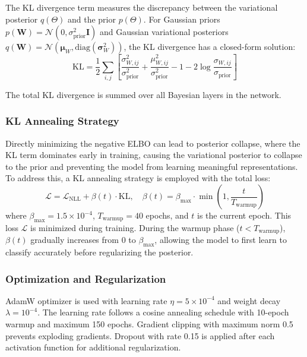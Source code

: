 \documentclass[lettersize,journal]{IEEEtran}
\begin{document}
The KL divergence term measures the discrepancy between the variational posterior $q(\Theta)$ and the prior $p(\Theta)$. For Gaussian priors $p(\mathbf{W}) = \mathcal{N}(0, \sigma_{\text{prior}}^2 \mathbf{I})$ and Gaussian variational posteriors $q(\mathbf{W}) = \mathcal{N}(\boldsymbol{\mu}_W, \text{diag}(\boldsymbol{\sigma}_W^2))$, the KL divergence has a closed-form solution:
\begin{equation}
\text{KL} = \frac{1}{2} \sum_{i,j} \left[ \frac{\sigma_{W,ij}^2}{\sigma_{\text{prior}}^2} + \frac{\mu_{W,ij}^2}{\sigma_{\text{prior}}^2} - 1 - 2\log\frac{\sigma_{W,ij}}{\sigma_{\text{prior}}} \right]
\end{equation}

The total KL divergence is summed over all Bayesian layers in the network.

\subsubsection{KL Annealing Strategy}

Directly minimizing the negative ELBO can lead to posterior collapse, where the KL term dominates early in training, causing the variational posterior to collapse to the prior and preventing the model from learning meaningful representations. To address this, a KL annealing strategy is employed with the total loss:
\begin{equation}
\mathcal{L} = \mathcal{L}_{\text{NLL}} + \beta(t) \cdot \text{KL}, \quad \beta(t) = \beta_{\max} \cdot \min\left(1, \frac{t}{T_{\text{warmup}}}\right)
\end{equation}
where $\beta_{\max}=1.5\times10^{-4}$, $T_{\text{warmup}}=40$ epochs, and $t$ is the current epoch. This loss $\mathcal{L}$ is minimized during training. During the warmup phase ($t < T_{\text{warmup}}$), $\beta(t)$ gradually increases from 0 to $\beta_{\max}$, allowing the model to first learn to classify accurately before regularizing the posterior.

\subsubsection{Optimization and Regularization}

AdamW optimizer is used with learning rate $\eta=5\times10^{-4}$ and weight decay $\lambda=10^{-4}$. The learning rate follows a cosine annealing schedule with 10-epoch warmup and maximum 150 epochs. Gradient clipping with maximum norm 0.5 prevents exploding gradients. Dropout with rate 0.15 is applied after each activation function for additional regularization.
\end{document}
